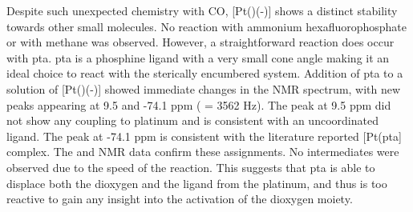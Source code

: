 Despite such unexpected chemistry with CO, [Pt(\tButhixantphos)(-)] shows a distinct stability towards other small molecules.  No reaction with ammonium hexafluorophosphate or with methane was observed.  However, a straightforward reaction does occur with \gls{pta}.  \Gls{pta} is a phosphine ligand with a very small cone angle making it an ideal choice to react with the sterically encumbered system.\cite{Phillips2004}  Addition of \gls{pta} to a solution of [Pt(\tButhixantphos)(-)] showed immediate changes in the \phosphorus{} NMR spectrum, with new peaks appearing at 9.5 and -74.1 ppm (\JPtP{} = 3562 Hz).  The peak at 9.5 ppm did not show any coupling to platinum and is consistent with an uncoordinated \tButhixantphos{} ligand.  The peak at -74.1 ppm is consistent with the literature reported [Pt(\gls{pta}] complex.\cite{Darensbourg1997}  The \proton{} and \carbon{} NMR data confirm these assignments.  No intermediates were observed due to the speed of the reaction.  This suggests that \gls{pta} is able to displace both the dioxygen and the \tButhixantphos{} ligand from the platinum, and thus is too reactive to gain any insight into the activation of the dioxygen moiety.  
%
%
%
%
%  
